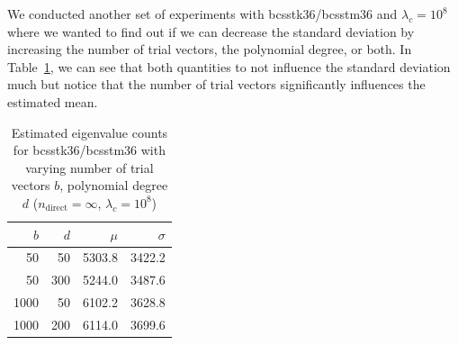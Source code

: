 \documentclass[%
	paper=a4,
	fontsize=10pt,
	DIV11,BCOR10mm,
	numbers=noenddot,
	abstract=yes
]{scrartcl}
\theoremstyle{definition}
\begin{document}
We conducted another set of experiments with bcsstk36/bcsstm36 and $\lambda_c =
10^8$ where we wanted to find out if we can decrease the standard deviation by
increasing the number of trial vectors, the polynomial degree, or both. In
Table~\ref{tab:eigenvalue-count-bcsstk36-1e8}, we can see that both quantities
to not influence the standard deviation much but notice that the number of trial
vectors significantly influences the estimated mean.

\begin{table}
	\centering
	\begin{tabular}{rrrr}
		$b$ & $d$ & $\mu$ & $\sigma$ \\
		\toprule
		  50 &  50 & 5303.8 & 3422.2 \\
		  50 & 300 & 5244.0 & 3487.6 \\
		1000 &  50 & 6102.2 & 3628.8 \\
		1000 & 200 & 6114.0 & 3699.6
	\end{tabular}
	\caption{Estimated eigenvalue counts for bcsstk36/bcsstm36 with varying
	number of trial vectors $b$, polynomial degree $d$ ($n_{\text{direct}} =
	\infty$, $\lambda_c = 10^8$)}
	\label{tab:eigenvalue-count-bcsstk36-1e8}
\end{table}

\printbibliography
\end{document}
